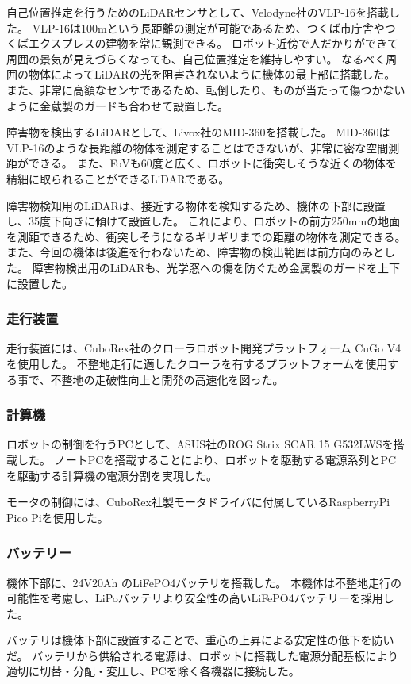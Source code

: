 自己位置推定を行うためのLiDARセンサとして、Velodyne社のVLP-16\cite{VLP16}を搭載した。
VLP-16は100mという長距離の測定が可能であるため、つくば市庁舎やつくばエクスプレスの建物を常に観測できる。
ロボット近傍で人だかりができて周囲の景気が見えづらくなっても、自己位置推定を維持しやすい。
なるべく周囲の物体によってLiDARの光を阻害されないように機体の最上部に搭載した。
また、非常に高額なセンサであるため、転倒したり、ものが当たって傷つかないように金蔵製のガードも合わせて設置した。

障害物を検出するLiDARとして、Livox社のMID-360\cite{MID360}を搭載した。
MID-360はVLP-16のような長距離の物体を測定することはできないが、非常に密な空間測距ができる。
また、FoVも60度と広く、ロボットに衝突しそうな近くの物体を精細に取られることができるLiDARである。

障害物検知用のLiDARは、接近する物体を検知するため、機体の下部に設置し、35度下向きに傾けて設置した。
これにより、ロボットの前方250mmの地面を測距できるため、衝突しそうになるギリギリまでの距離の物体を測定できる。
また、今回の機体は後進を行わないため、障害物の検出範囲は前方向のみとした。
障害物検出用のLiDARも、光学窓への傷を防ぐため金属製のガードを上下に設置した。

\subsubsection{走行装置}
走行装置には、CuboRex社のクローラロボット開発プラットフォーム CuGo V4\cite{CuGo}を使用した。
不整地走行に適したクローラを有するプラットフォームを使用する事で、不整地の走破性向上と開発の高速化を図った。

\subsubsection{計算機}
ロボットの制御を行うPCとして、ASUS社のROG Strix SCAR 15 G532LWS\cite{PC}を搭載した。
ノートPCを搭載することにより、ロボットを駆動する電源系列とPCを駆動する計算機の電源分割を実現した。

モータの制御には、CuboRex社製モータドライバに付属しているRaspberryPi Pico Pi\cite{PICO}を使用した。

\subsubsection{バッテリー}
機体下部に、24V20Ah のLiFePO4バッテリを搭載した。
本機体は不整地走行の可能性を考慮し、LiPoバッテリより安全性の高いLiFePO4バッテリーを採用した。

バッテリは機体下部に設置することで、重心の上昇による安定性の低下を防いだ。
バッテリから供給される電源は、ロボットに搭載した電源分配基板により適切に切替・分配・変圧し、PCを除く各機器に接続した。

